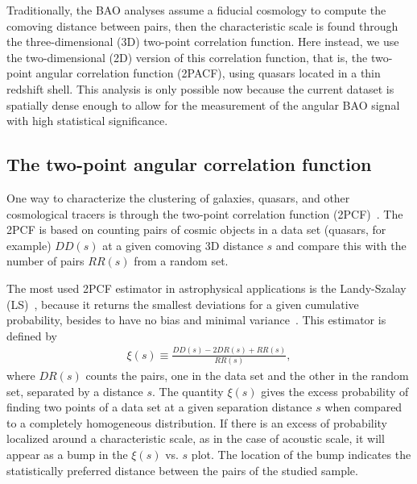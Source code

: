 \documentclass[a4paper,11pt]{article}
\begin{document}
Traditionally, the BAO analyses assume a fiducial cosmology to compute the comoving distance 
between pairs, then the characteristic scale is found through the three-dimensional (3D) two-point 
correlation function. 
Here instead, we use the two-dimensional (2D) version of this correlation function, that is, the 
two-point angular correlation function (2PACF), using quasars located in a thin redshift shell. 
This analysis is only possible now because the current dataset is spatially dense enough to 
allow for the measurement of the angular BAO signal with high statistical significance. 


\subsection{The two-point angular correlation function}

\noindent
One way to characterize the clustering of galaxies, quasars, and other cosmological tracers is through 
the two-point correlation function (2PCF)~\cite{Peebles-Hauser,Davis-Peebles,Hewett,Hamilton,%
Landy-Szalay}. 
The 2PCF is based on counting pairs of cosmic objects in a data set (quasars, for example) $DD(s)$ 
at a given comoving 3D distance $s$ and compare this with the number of pairs $RR(s)$ from a 
random set. 

The most used 2PCF estimator in astrophysical applications is the Landy-Szalay 
(LS)~\cite{Landy-Szalay}, because it returns the smallest deviations for a given cumulative probability, 
besides to have no bias and minimal variance~\cite{Kerscher}. 
This estimator is defined by 
	\begin{eqnarray}\label{2PCF}
	\xi(s) \equiv \frac{DD(s) - 2DR(s) + RR(s)}{RR(s)},
	\end{eqnarray} 
where $DR(s)$ counts the pairs, one in the data set and the other in the random set, separated by a 
distance $s$. 
The quantity $\xi(s)$ gives the excess probability of finding two points of a data set at a given 
separation distance $s$ when compared to a completely homogeneous distribution. 
If there is an excess of probability localized around a characteristic scale, as in the case of acoustic 
scale, it will appear as a bump in the $\xi(s)$ vs. $s$ plot. 
The location of the bump indicates the statistically preferred distance between the pairs of the studied 
sample. 
\end{document}
